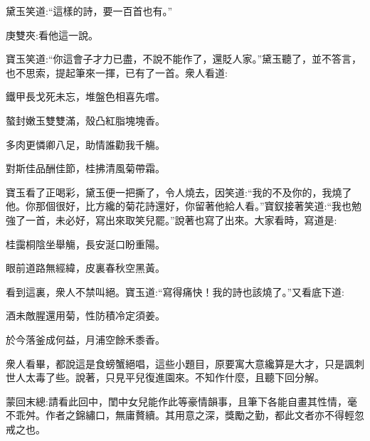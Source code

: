 \begin{parag}
    黛玉笑道:“這樣的詩，要一百首也有。”\begin{note}庚雙夾:看他這一說。\end{note}寶玉笑道:“你這會子才力已盡，不說不能作了，還貶人家。”黛玉聽了，並不答言，也不思索，提起筆來一揮，已有了一首。衆人看道:
\end{parag}


\begin{poem}
    \begin{pl}鐵甲長戈死未忘，堆盤色相喜先嚐。\end{pl}

    \begin{pl}螯封嫩玉雙雙滿，殼凸紅脂塊塊香。\end{pl}

    \begin{pl}多肉更憐卿八足，助情誰勸我千觴。\end{pl}

    \begin{pl}對斯佳品酬佳節，桂拂清風菊帶霜。\end{pl}


\end{poem}


\begin{parag}
    寶玉看了正喝彩，黛玉便一把撕了，令人燒去，因笑道:“我的不及你的，我燒了他。你那個很好，比方纔的菊花詩還好，你留著他給人看。”寶釵接著笑道:“我也勉強了一首，未必好，寫出來取笑兒罷。”說著也寫了出來。大家看時，寫道是:
\end{parag}


\begin{poem}
    \begin{pl}桂靄桐陰坐舉觴，長安涎口盼重陽。\end{pl}

    \begin{pl}眼前道路無經緯，皮裏春秋空黑黃。\end{pl}

\end{poem}


\begin{parag}
    看到這裏，衆人不禁叫絕。寶玉道:“寫得痛快！我的詩也該燒了。”又看底下道:
\end{parag}


\begin{poem}
    \begin{pl}酒未敵腥還用菊，性防積冷定須姜。\end{pl}

    \begin{pl}於今落釜成何益，月浦空餘禾黍香。\end{pl}

\end{poem}


\begin{parag}
    衆人看畢，都說這是食螃蟹絕唱，這些小題目，原要寓大意纔算是大才，只是諷刺世人太毒了些。說著，只見平兒復進園來。不知作什麼，且聽下回分解。
\end{parag}


\begin{parag}
    \begin{note}蒙回末總:請看此回中，閨中女兒能作此等豪情韻事，且筆下各能自畫其性情，毫不乖舛。作者之錦繡口，無庸贅續。其用意之深，獎勵之勤，都此文者亦不得輕忽戒之也。\end{note}
\end{parag}
